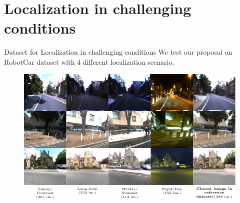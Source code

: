 \section{Localization in challenging conditions}

\label{sec:results}

\begin{frame}{Dataset for Localization in challenging conditions}
	We test our proposal on RobotCar dataset with 4 different localization scenario.
	\begin{figure}
		\includegraphics[width=0.7\linewidth]{vect/res/dataset}
	\end{figure}		
\end{frame}


